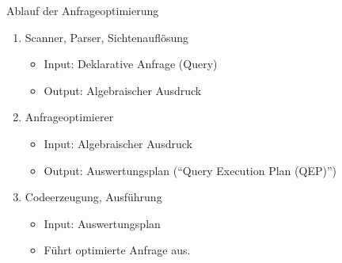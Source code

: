 \begin{defi}{Ablauf der Anfrageoptimierung}
    \begin{enumerate}
        \item Scanner, Parser, Sichtenauflösung
              \begin{itemize}
                  \item Input: Deklarative Anfrage (Query)
                  \item Output: Algebraischer Ausdruck
              \end{itemize}
        \item Anfrageoptimierer
              \begin{itemize}
                  \item Input: Algebraischer Ausdruck
                  \item Output: Auswertungsplan (\enquote{Query Execution Plan (QEP)})
              \end{itemize}
        \item Codeerzeugung, Ausführung
              \begin{itemize}
                  \item Input: Auswertungsplan
                  \item Führt optimierte Anfrage aus.
              \end{itemize}
    \end{enumerate}
\end{defi}

